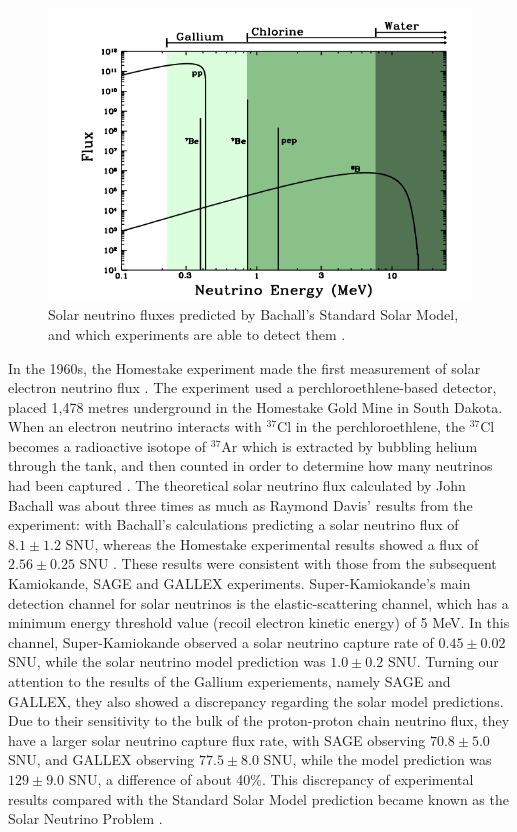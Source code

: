 \begin{figure}
    \includegraphics[width=\textwidth]{Figures/nu_energy_bachall.png}
    \caption{Solar neutrino fluxes predicted by Bachall's Standard Solar Model, and which experiments are able to detect them \cite{Bahcall_2003}.}
    \label{fig:nu_energy_bachall}
\end{figure}

In the 1960s, the Homestake experiment made the first measurement of solar electron neutrino flux \cite{homestake_davis}. The experiment used a perchloroethlene-based detector, placed 1,478 metres underground in the Homestake Gold Mine in South Dakota. When an electron neutrino interacts with ${ }^{37} \mathrm{Cl}$ in the perchloroethlene, the ${ }^{37} \mathrm{Cl}$ becomes a radioactive isotope of ${ }^{37} \mathrm{Ar}$ which is extracted by bubbling helium through the tank, and then counted in order to determine how many neutrinos had been captured \cite{davis1994review}. The theoretical solar neutrino flux calculated by John Bachall was about three times as much as Raymond Davis' results from the experiment: with Bachall's calculations predicting a solar neutrino flux of $8.1 \pm 1.2$ SNU, whereas the Homestake experimental results showed a flux of $2.56 \pm 0.25$ SNU \cite{JKonijn1999}. These results were consistent with those from the subsequent Kamiokande, SAGE and GALLEX experiments. Super-Kamiokande's main detection channel for solar neutrinos is the elastic-scattering channel, which has a minimum energy threshold value (recoil electron kinetic energy) of 5 MeV. In this channel, Super-Kamiokande observed a solar neutrino capture rate of $0.45 \pm 0.02$ SNU, while the solar neutrino model prediction was $1.0 \pm 0.2$ SNU. Turning our attention to the results of the Gallium experiements, namely SAGE and GALLEX, they also showed a discrepancy regarding the solar model predictions. Due to their sensitivity to the bulk of the proton-proton chain neutrino flux, they have a larger solar neutrino capture flux rate, with SAGE observing $70.8 \pm 5.0$ SNU, and GALLEX observing $77.5 \pm 8.0$ SNU, while the model prediction was $129 \pm 9.0$ SNU, a difference of about 40\%. This discrepancy of experimental results compared with the Standard Solar Model prediction became known as the Solar Neutrino Problem \cite{Haxton_1995}. 

